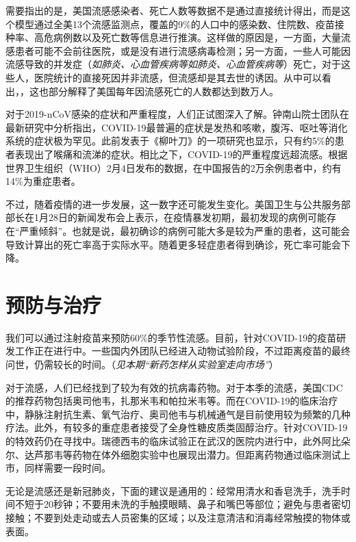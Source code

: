 \begin{multicols}{3}
需要指出的是，美国流感感染者、死亡人数等数据不是通过直接统计得出，而是这个模型通过全美13个流感监测点，覆盖的9{\%}的人口中的感染数、住院数、疫苗接种率、高危病例数以及死亡数等信息进行推演。这样做的原因是，一方面，大量流感患者可能不会前往医院，或是没有进行流感病毒检测；另一方面，一些人可能因流感导致的并发症（\textit{如肺炎、心血管疾病等}\textit{如肺炎、心血管疾病等}）死亡，对于这些人，医院统计的直接死因并非流感，但流感却是其去世的诱因。从中可以看出，，这也部分解释了美国每年因流感死亡的人数都达到数万人。

对于2019-nCoV感染的症状和严重程度，人们正试图深入了解。钟南山院士团队在最新研究中分析指出，COVID-19最普遍的症状是发热和咳嗽，腹泻、呕吐等消化系统的症状极为罕见。此前发表于《柳叶刀》的一项研究也显示，只有约5{\%}的患者表现出了喉痛和流涕的症状。相比之下，COVID-19的严重程度远超流感。根据世界卫生组织（WHO）2月4日发布的数据，在中国报告的2万余例患者中，约有14{\%}为重症患者。

不过，随着疫情的进一步发展，这一数字还可能发生变化。美国卫生与公共服务部部长在1月28日的新闻发布会上表示，在疫情暴发初期，最初发现的病例可能存在``严重倾斜''。也就是说，最初确诊的病例可能大多是较为严重的患者，这可能会导致计算出的死亡率高于实际水平。随着更多轻症患者得到确诊，死亡率可能会下降。

\section*{预防与治疗}
我们可以通过注射疫苗来预防60{\%}的季节性流感。目前，针对COVID-19的疫苗研发工作正在进行中。一些国内外团队已经进入动物试验阶段，不过距离疫苗的最终问世，仍需较长的时间。（\textit{见本期“新药怎样从实验室走向市场”}）

对于流感，人们已经找到了较为有效的抗病毒药物。对于本季的流感，美国CDC的推荐药物包括奥司他韦，扎那米韦和帕拉米韦等。而在COVID-19的临床治疗中，静脉注射抗生素、氧气治疗、奥司他韦与机械通气是目前使用较为频繁的几种疗法。此外，有较多的重症患者接受了全身性糖皮质类固醇治疗。针对COVID-19的特效药仍在寻找中。瑞德西韦的临床试验正在武汉的医院内进行中，此外阿比朵尔、达芦那韦等药物在体外细胞实验中也展现出潜力。但距离药物通过临床测试上市，同样需要一段时间。

无论是流感还是新冠肺炎，下面的建议是通用的：经常用清水和香皂洗手，洗手时间不短于20秒钟；不要用未洗的手触摸眼睛、鼻子和嘴巴等部位；避免与患者密切接触；不要到处走动或去人员密集的区域；以及注意清洁和消毒经常触摸的物体或表面。\EOA
\end{multicols}
\ADhairui
\newpage
{}

